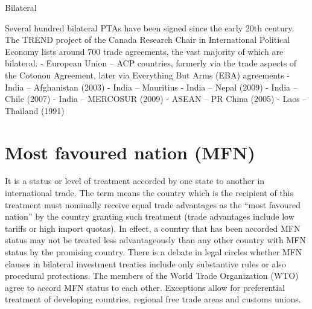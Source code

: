 \documentclass[]{book}
\begin{document}
Bilateral

Several hundred bilateral PTAs have been signed since the early 20th century. The TREND project of the Canada Research Chair in International Political Economy lists around 700 trade agreements, the vast majority of which are bilateral.
- European Union -- ACP countries, formerly via the trade aspects of the Cotonou Agreement, later via Everything But Arms (EBA) agreements
- India -- Afghanistan (2003)
- India -- Mauritius
- India -- Nepal (2009)
- India -- Chile (2007)
- India -- MERCOSUR (2009)
- ASEAN -- PR China (2005)
- Laos -- Thailand (1991)

\hypertarget{most-favoured-nation-mfn}{%
\section{Most favoured nation (MFN)}\label{most-favoured-nation-mfn}}

It is a status or level of treatment accorded by one state to another in international trade. The term means the country which is the recipient of this treatment must nominally receive equal trade advantages as the ``most favoured nation'' by the country granting such treatment (trade advantages include low tariffs or high import quotas). In effect, a country that has been accorded MFN status may not be treated less advantageously than any other country with MFN status by the promising country. There is a debate in legal circles whether MFN clauses in bilateral investment treaties include only substantive rules or also procedural protections. The members of the World Trade Organization (WTO) agree to accord MFN status to each other. Exceptions allow for preferential treatment of developing countries, regional free trade areas and customs unions.
\end{document}
